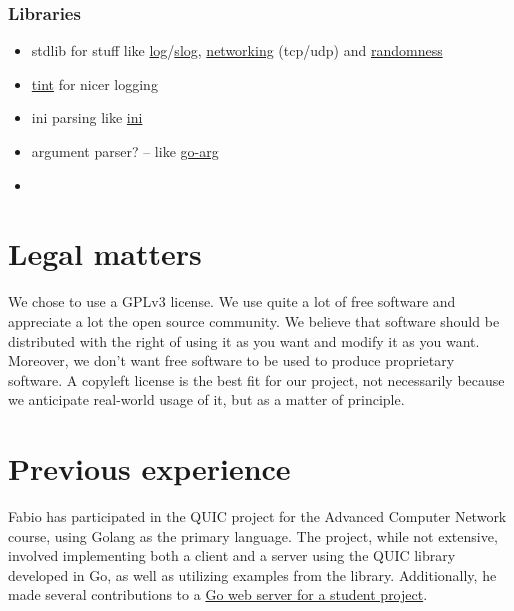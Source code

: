 \documentclass[a4paper,english,10pt,NET]{tumarticle}
\begin{document}

\subsubsection{Libraries}
\begin{itemize}
	\item stdlib for stuff like \href{https://pkg.go.dev/log}{log}/\href{https://pkg.go.dev/log/slog@go1.22.2}{slog}, \href{https://pkg.go.dev/net}{networking} (tcp/udp) and \href{https://pkg.go.dev/crypto/rand}{randomness}  %
	\item \href{github.com/lmittmann/tint}{tint} for nicer logging
	\item ini parsing like \href{gopkg.in/ini.v1}{ini}
	\item argument parser? -- like \href{https://github.com/alexflint/go-arg}{go-arg}
	\item {}
\end{itemize}

\section{Legal matters}


We chose to use a GPLv3 license.
We use quite a lot of free software and appreciate a lot the open source community. We believe that software should be distributed with the right of using it as you want and modify it as you want. Moreover, we don't want free software to be used to produce proprietary software. A copyleft license is the best fit for our project, not necessarily because we anticipate real-world usage of it, but as a matter of principle.


\section{Previous experience}

Fabio has participated in the QUIC project for the Advanced Computer Network course, using Golang as the primary language. The project, while not extensive, involved implementing both a client and a server using the QUIC library developed in Go, as well as utilizing examples from the library. Additionally, he made several contributions to a \href{https://github.com/csunibo/polleg}{Go web server for a student project}.
\end{document}
